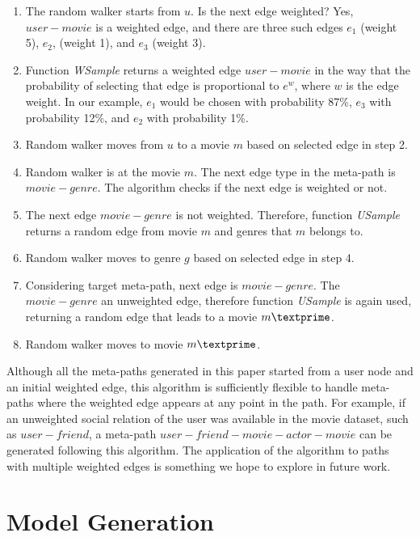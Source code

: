 \documentclass {acmart}
\begin{document}
\begin{enumerate}
  \item The random walker starts from $u$. Is the next edge weighted?  Yes, $user-movie$ is a weighted edge, and there are three such edges $e_1$ (weight 5), $e_2$, (weight 1), and $e_3$ (weight 3). 
  \item Function \textit{WSample} returns a weighted edge $user-movie$ in the way that the probability of selecting that edge is proportional to $e^w$, where $w$ is the edge weight. In our example, $e_1$ would be chosen with probability 87\%, $e_3$ with probability 12\%, and $e_2$ with probability 1\%. 
  \item Random walker moves from $u$ to a movie $m$ based on selected edge in step 2.
  \item Random walker is at the movie $m$. The next edge type in the meta-path is $movie-genre$. The algorithm checks if the next edge is weighted or not.
  \item The next edge $movie-genre$ is not weighted. Therefore, function \textit{USample} returns a random edge from movie $m$ and genres that $m$ belongs to.
  \item Random walker moves to genre $g$ based on selected edge in step 4. 
  \item Considering target meta-path, next edge is $movie-genre$. The $movie-genre$ an unweighted edge, therefore function \textit{USample} is again used, returning a random edge that leads to a movie $m \textprime$.  
  \item Random walker moves to movie $m \textprime$.
\end{enumerate}

Although all the meta-paths generated in this paper started from a user node and an initial weighted edge, this algorithm is sufficiently flexible to handle meta-paths where the weighted edge appears at any point in the path. For example, if an unweighted social relation of the user was available in the movie dataset, such as $user-friend$, a meta-path $user-friend-movie-actor-movie$ can be generated following this algorithm. The application of the algorithm to paths with multiple weighted edges is something we hope to explore in future work.

\section{Model Generation}
\end{document}
